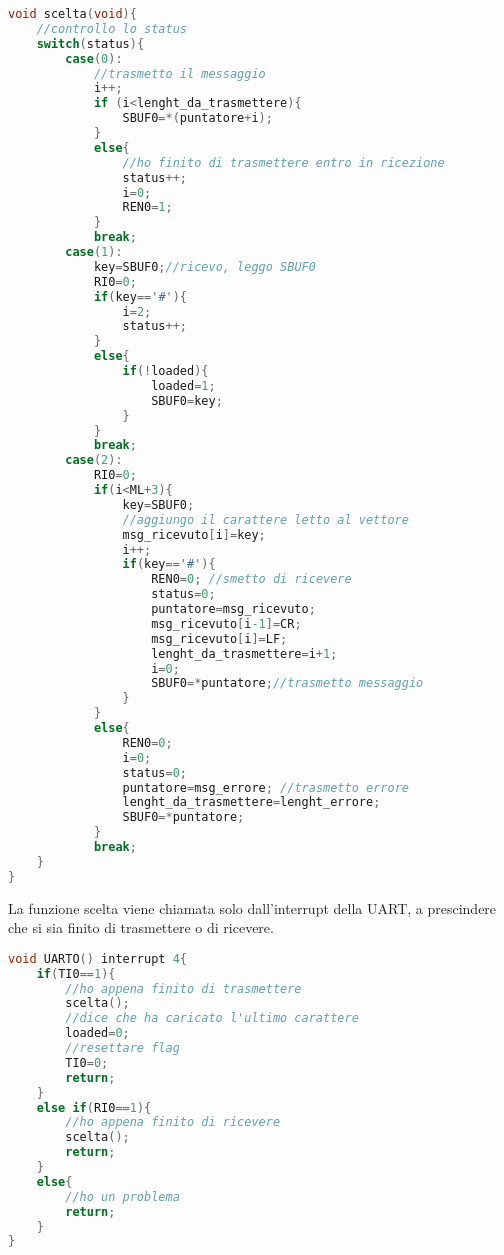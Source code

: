 \documentclass[main.tex]{subfiles}
\begin{document}
\begin{lstlisting}[language=C,caption=Funzione scelta,label={lst:scelta}]
void scelta(void){
	//controllo lo status
	switch(status){
		case(0):
			//trasmetto il messaggio
			i++;
			if (i<lenght_da_trasmettere){
				SBUF0=*(puntatore+i);
			}
			else{
				//ho finito di trasmettere entro in ricezione
				status++;
				i=0;
				REN0=1;
			}
			break;
		case(1):
			key=SBUF0;//ricevo, leggo SBUF0
			RI0=0;
			if(key=='#'){
				i=2;
				status++;
			}
			else{
				if(!loaded){
					loaded=1;
					SBUF0=key;
				}
			}
			break;
		case(2):
			RI0=0;
			if(i<ML+3){
				key=SBUF0;
				//aggiungo il carattere letto al vettore
				msg_ricevuto[i]=key;
				i++;
				if(key=='#'){
					REN0=0; //smetto di ricevere
					status=0;
					puntatore=msg_ricevuto;
					msg_ricevuto[i-1]=CR;
					msg_ricevuto[i]=LF;
					lenght_da_trasmettere=i+1;
					i=0;
					SBUF0=*puntatore;//trasmetto messaggio
				}
			}
			else{
				REN0=0;
				i=0;
				status=0;
				puntatore=msg_errore; //trasmetto errore
				lenght_da_trasmettere=lenght_errore;
				SBUF0=*puntatore;
			}
			break;
	}
}
\end{lstlisting}
La funzione scelta viene chiamata solo dall'interrupt della UART, a prescindere che si sia finito di trasmettere o di ricevere.
\begin{lstlisting}[language=C,caption=Interrupt UART]
void UARTO() interrupt 4{
	if(TI0==1){
		//ho appena finito di trasmettere
		scelta();
		//dice che ha caricato l'ultimo carattere
		loaded=0; 
		//resettare flag
		TI0=0;
		return;
	}
	else if(RI0==1){
		//ho appena finito di ricevere
		scelta();
		return;
	}
	else{
		//ho un problema
		return;
	}
}
\end{lstlisting}
\end{document}
